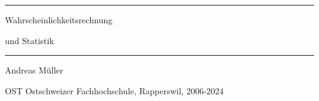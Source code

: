 \documentclass[a4paper,12pt]{book}
\begin{document}
\pagestyle{fancy}
\frontmatter
\newcommand\HRule{\noindent\rule{\linewidth}{1.5pt}}
\begin{titlepage}
\HRule
\vspace*{10pt}
\begin{flushright}
{\Huge
Wahrscheinlichkeitsrechnung}
\end{flushright}
\begin{flushright}
{\Huge und Statistik}
\end{flushright}
\HRule
\begin{flushright}
\vspace{30pt}
\LARGE
Andreas Müller
\end{flushright}
\begin{center}
OST Ostschweizer Fachhochschule, Rapperswil, 2006-2024
\end{center}
\end{titlepage}

\newenvironment{beispiele}{
\bgroup\smallskip\parindent0pt\bf Beispiele\egroup

\begin{list}{\arabic{beispiel}.}
  {\usecounter{beispiel}
  \setlength{\labelsep}{5mm}
  \setlength{\rightmargin}{0pt}
}}{\end{list}}
\newenvironment{teilaufgaben}{
\begin{enumerate}
\renewcommand{\labelenumi}{\alph{enumi})}
}{\end{enumerate}}
\newenvironment{beispiel}[1][Beispiel]{%
\begin{proof}[\bf #1]%
\renewcommand{\qedsymbol}{$\bigcirc$}%
}{\end{proof}}
\def\swallow#1{
}
\newenvironment{loesung}{%
\begin{proof}[Lösung]%
\renewcommand{\qedsymbol}{$\bigcirc$}
}{\end{proof}}
\def\keineloesungen{%
\renewenvironment{loesung}{\swallow\begingroup}{\endgroup}%
}

\hypersetup{
    linktoc=all,
    linkcolor=blue
}

\fancyfoot{}
\fancyhead{}
\def\kopfrechts#1{
\global\def\kopfinhalt{#1}
\xdef\theshortsection{\thechapter.\arabic{section}}%
\fancyhead[LO]{\theshortsection. #1}}
% 
\def\kopflinks#1{%
\global\def\kapitelinhalt{#1}
\fancyhead[RE]{\thechapter. #1}
\thispagestyle{empty}
\fancyhead[LO]{}}
\fancyhead[LE]{\thepage}
\fancyhead[RO]{\thepage}
\end{document}
